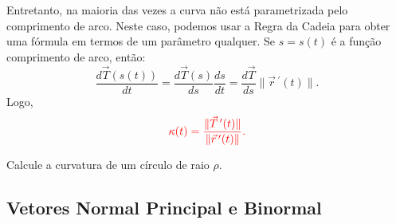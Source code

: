 \begin{frame}[label=fun-vet]
Entretanto, na maioria das vezes a curva não está parametrizada pelo comprimento de arco. Neste caso, podemos usar a Regra da Cadeia para obter uma fórmula em termos de um parâmetro qualquer. Se $s=s(t)$ é a função comprimento de arco, então:
\[\frac{d\vec{T}(s(t))}{dt}=\frac{d\vec{T}(s)}{ds}\frac{ds}{dt}=\frac{d\vec{T}}{ds}\|\vec{r}\,^\prime(t)\|.\]
Logo,
\[{\color{red} \kappa(t) =\frac{\|\vec{T}\,^\prime(t)\|}{\|\vec{r}\,^\prime(t)\|}.}\]

\begin{exe}
Calcule a curvatura de um círculo de raio $\rho$.
\end{exe}
\end{frame}


\subsection*{Vetores Normal Principal e Binormal}

